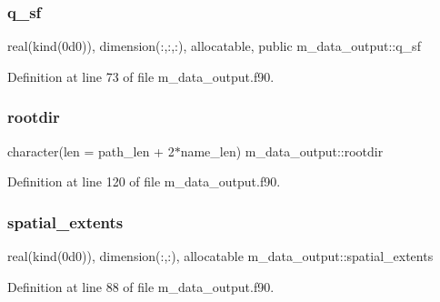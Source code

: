 \subsubsection{\texorpdfstring{q\+\_\+sf}{q\_sf}}
{\footnotesize\ttfamily real(kind(0d0)), dimension(\+:,\+:,\+:), allocatable, public m\+\_\+data\+\_\+output\+::q\+\_\+sf}



Definition at line 73 of file m\+\_\+data\+\_\+output.\+f90.

\mbox{\label{namespacem__data__output_ae33b2fd4aa2594f18dd34e20b66813bb}} 
\subsubsection{\texorpdfstring{rootdir}{rootdir}}
{\footnotesize\ttfamily character(len = path\+\_\+len + 2$\ast$name\+\_\+len) m\+\_\+data\+\_\+output\+::rootdir}



Definition at line 120 of file m\+\_\+data\+\_\+output.\+f90.

\mbox{\label{namespacem__data__output_a20a29bb6bd9724b83d4abab91f1b99a3}} 
\subsubsection{\texorpdfstring{spatial\+\_\+extents}{spatial\_extents}}
{\footnotesize\ttfamily real(kind(0d0)), dimension(\+:,\+:), allocatable m\+\_\+data\+\_\+output\+::spatial\+\_\+extents}



Definition at line 88 of file m\+\_\+data\+\_\+output.\+f90.

